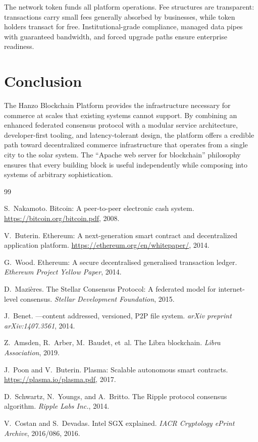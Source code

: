 \documentclass[11pt,twocolumn]{article}
\begin{document}
The network token funds all platform operations. Fee structures are transparent:
transactions carry small fees generally absorbed by businesses, while token
holders transact for free. Institutional-grade compliance, managed data pipes
with guaranteed bandwidth, and forced upgrade paths ensure enterprise readiness.

\section{Conclusion}
\label{sec:conclusion}

The Hanzo Blockchain Platform provides the infrastructure necessary for commerce
at scales that existing systems cannot support. By combining an enhanced
federated consensus protocol with a modular service architecture, developer-first
tooling, and latency-tolerant design, the platform offers a credible path toward
decentralized commerce infrastructure that operates from a single city to the
solar system. The ``Apache web server for blockchain'' philosophy ensures that
every building block is useful independently while composing into systems of
arbitrary sophistication.

\begin{thebibliography}{99}

S.~Nakamoto.
\newblock Bitcoin: A peer-to-peer electronic cash system.
\newblock \url{https://bitcoin.org/bitcoin.pdf}, 2008.

V.~Buterin.
\newblock Ethereum: A next-generation smart contract and decentralized
application platform.
\newblock \url{https://ethereum.org/en/whitepaper/}, 2014.

G.~Wood.
\newblock Ethereum: A secure decentralised generalised transaction ledger.
\newblock \emph{Ethereum Project Yellow Paper}, 2014.

D.~Mazi\`eres.
\newblock The {Stellar Consensus Protocol}: A federated model for
internet-level consensus.
\newblock \emph{Stellar Development Foundation}, 2015.

J.~Benet.
---content addressed, versioned, {P2P} file system.
\newblock \emph{arXiv preprint arXiv:1407.3561}, 2014.

Z.~Amsden, R.~Arber, M.~Baudet, et~al.
\newblock The {Libra} blockchain.
\newblock \emph{Libra Association}, 2019.

J.~Poon and V.~Buterin.
\newblock Plasma: Scalable autonomous smart contracts.
\newblock \url{https://plasma.io/plasma.pdf}, 2017.

D.~Schwartz, N.~Youngs, and A.~Britto.
\newblock The {Ripple} protocol consensus algorithm.
\newblock \emph{Ripple Labs Inc.}, 2014.

V.~Costan and S.~Devadas.
\newblock Intel {SGX} explained.
\newblock \emph{IACR Cryptology ePrint Archive}, 2016/086, 2016.

\end{thebibliography}
\end{document}
